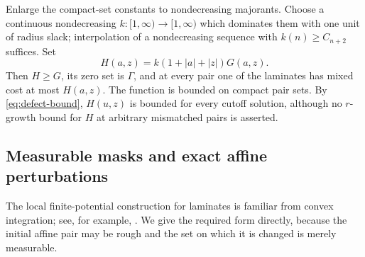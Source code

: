 \documentclass[11pt]{article}
\theoremstyle{remark}
\begin{document}
Enlarge the compact-set constants to nondecreasing majorants. Choose a
continuous nondecreasing $k:[1,\infty)\to[1,\infty)$ which dominates
them with one unit of radius slack; interpolation of a nondecreasing
sequence with $k(n)\ge C_{n+2}$ suffices. Set
\begin{equation}\label{eq:H}
 H(a,z)=k(1+|a|+|z|)G(a,z).
\end{equation}
Then $H\ge G$, its zero set is $\Gamma$, and at every pair one
of the laminates has mixed cost at most $H(a,z)$.
The function is bounded on compact pair sets. By \eqref{eq:defect-bound},
$H(u,z)$ is bounded for every cutoff solution, although no $r$-growth
bound for $H$ at arbitrary mismatched pairs is asserted.

\subsection{Measurable masks and exact affine perturbations}
The local finite-potential construction for laminates is familiar from
convex integration; see, for example, \cite[Proposition 4.5]{ST21}.
We give the required form directly, because the initial affine pair may
be rough and the set on which it is changed is merely measurable.
\end{document}
